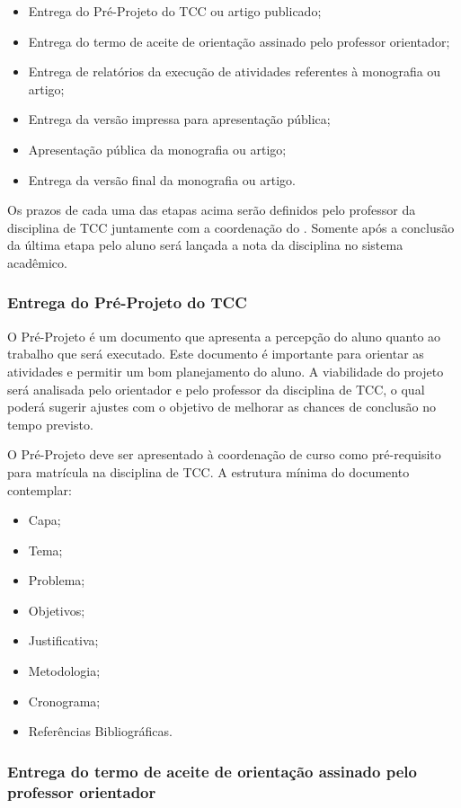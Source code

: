 \documentclass{paper}
\begin{document}
\begin{itemize}
\item Entrega do Pré-Projeto do TCC ou artigo publicado;
\item Entrega do termo de aceite de orientação assinado pelo professor orientador;
\item Entrega de relatórios da execução de atividades referentes à monografia ou artigo;
\item Entrega da versão impressa para apresentação pública;
\item Apresentação pública da monografia ou artigo;
\item Entrega da versão final da monografia ou artigo.
\end{itemize}

Os prazos de cada uma das etapas acima serão definidos pelo professor da disciplina de TCC juntamente com a coordenação
do \NOMECURSO. Somente após a conclusão da última etapa pelo aluno será lançada a nota da disciplina no sistema acadêmico.

\subsubsection{Entrega do Pré-Projeto do TCC}

O Pré-Projeto é um documento que apresenta a percepção do aluno quanto ao trabalho que será executado. Este documento é importante para orientar as atividades e permitir um bom planejamento do aluno. A viabilidade do projeto será analisada pelo orientador e pelo professor da disciplina de TCC, o qual poderá sugerir ajustes com o objetivo de melhorar as chances de conclusão no tempo previsto.

O Pré-Projeto deve ser apresentado à coordenação de curso como pré-requisito para matrícula na disciplina de TCC. A estrutura mínima do documento contemplar:

\begin{itemize}
\item Capa;
\item Tema;
\item Problema;
\item Objetivos;
\item Justificativa;
\item Metodologia;
\item Cronograma;
\item Referências Bibliográficas.
\end{itemize}

\subsubsection{Entrega do termo de aceite de orientação assinado pelo professor orientador}
\end{document}
